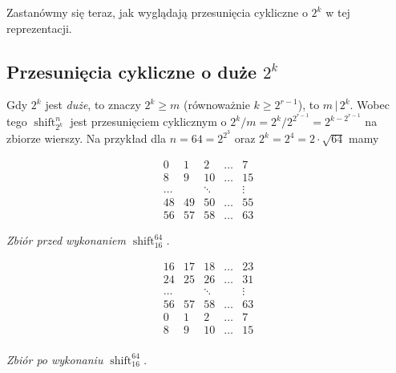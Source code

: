 \documentclass[a4paper]{article}
\newcommand{\shift}[2]{\operatorname{shift}_{#2}^{#1}}
\theoremstyle{definition}
\begin{document}
Zastanówmy się teraz, jak wyglądają przesunięcia cykliczne o \(2^k\) w tej reprezentacji.

\subsection{Przesunięcia cykliczne o duże \(2^k\)}

 Gdy \(2^k\) jest \textit{duże}, to znaczy \(2^k \geq m\) (równoważnie \(k \geq 2^{r-1}\)), to \(m \, | \, 2^k\). Wobec tego \(\shift n {2^k}\) jest przesunięciem cyklicznym o \(2^k / m = 2^k / 2^{2^{r-1}} = 2^{k - 2^{r-1}}\) na zbiorze wierszy. Na przykład dla \(n = 64 = 2^{2^3}\) oraz \(2^k = 2^4 = 2 \cdot \sqrt{64}\) mamy

\vspace{0.5em}

\begin{minipage}{.5\textwidth} %

\[
\begin{matrix}
 0 &  1 &  2 &  \ldots & 7 \\
 8 &  9 & 10 &  \ldots & 15 \\
\ldots & & \ddots &  & \vdots \\
48 & 49 & 50 & \ldots & 55 \\
56 & 57 & 58 & \ldots & 63 
\end{matrix}
\]

\begin{center} \it
    Zbiór przed wykonaniem \(\shift {64} {16}\).
\end{center}

\end{minipage} %
\begin{minipage}{.5\textwidth} %

\[
\begin{matrix}
16 & 17 & 18 & \ldots & 23 \\
24 & 25 & 26 & \ldots & 31 \\
\ldots & & \ddots &  & \vdots \\
56 & 57 & 58 & \ldots & 63 \\
0 &  1 &  2 &  \ldots & 7 \\
8 &  9 & 10 &  \ldots & 15 \\
\end{matrix}
\]

\begin{center} \it
    Zbiór po wykonaniu \(\shift {64} {16}\).
\end{center}
\end{minipage}
\end{document}
